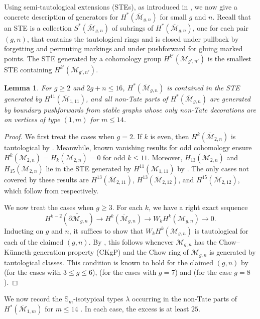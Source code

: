 \documentclass[12pt]{amsart}
\newtheorem{lem}[thm]{Lemma}
\theoremstyle{definition}
\numberwithin{equation}{section}
\renewcommand{\ss}{\mathbb{S}}
\newcommand{\M}{\mathcal{M}}
\renewcommand{\tilde}{\widetilde}
\newcommand{\Mb}{\overline{\M}}
\theoremstyle{definition} %
\theoremstyle{remark}
\begin{document}
Using semi-tautological extensions (STEs), as introduced in \cite[Definition~1.2]{CLP-STE}, we now give a concrete description of generators for $H^*(\Mb_{g,n})$ for small $g$ and $n$. Recall that an STE is a collection $S^*(\Mb_{g,n})$ of subrings of $H^*(\Mb_{g,n})$, one for each pair $(g,n)$, that contains the tautological rings and is closed under pullback by forgetting and permuting markings and under pushforward for gluing marked points. The STE generated by a cohomology group $H^{k'}(\Mb_{g',n'})$ is the smallest STE containing $H^{k'}(\Mb_{g',n'})$.
\begin{lem}\label{lem: onlygenus1}
    For $g\geq 2$ and $2g+n\leq 16$, $H^*(\Mb_{g,n})$ is contained in the STE generated by $H^{11}(\Mb_{1,11})$, and 
    all non-Tate parts of $H^*(\Mb_{g,n})$ are generated by boundary pushforwards from stable graphs whose only non-Tate decorations are on vertices of type $(1, m)$ for $m\leq 14$.
\end{lem}
\begin{proof}
We first treat the cases when $g = 2$. If $k$ is even, then $H^k(\Mb_{2,n})$ is tautological by \cite[Theorem 3.8]{Petersen}. 
Meanwhile, known vanishing results for odd cohomology \cite{ArbarelloCornalba,BergstromFaberPayne,CanningLarsonPayne} ensure $H^k(\Mb_{2,n}) = H_k(\Mb_{2,n}) = 0$ for odd $k \leq 11$. Moreover, $H_{13}(\Mb_{2,n})$ and $H_{15}(\Mb_{2,n})$ lie in the STE generated by $H^{11}(\Mb_{1,11})$ by \cite[Theorem 1.6 and Lemma 8.1]{CLP-STE}.
The only cases not covered by these results are $H^{13}(\Mb_{2,11})$, $H^{13}(\Mb_{2,12})$, and $H^{15}(\Mb_{2,12})$, which follow from \cite[Lemmas 7.1, 7.7, and 7.3]{CLP-STE} respectively.

We now treat the cases when $g \geq 3$. For each $k$, we have a right exact sequence
    \[
    H^{k-2}(\tilde{\partial \M_{g,n}})\rightarrow H^{k}(\Mb_{g,n})\rightarrow W_k H^{k}(\M_{g,n})\rightarrow 0. 
    \]
Inducting on $g$ and $n$, it suffices to show that $W_kH^k(\M_{g,n})$ is tautological for each of the claimed $(g, n)$.
By \cite[Lemma 4.3]{CLP-STE}, this follows whenever $\M_{g,n}$ has the Chow--K\"unneth generation property (CKgP) and
the Chow ring of $\M_{g,n}$ is generated by tautological classes. This condition is known to hold for the claimed $(g, n)$ by 
\cite[Theorem 1.4]{CL-CKgP} (for the cases with $3 \leq g \leq 6$), \cite[Theorem 1.10]{CLP-STE} (for the cases with $g = 7$) and
\cite[Theorem 1.2]{CanningLarson789} (for the case $g = 8$).
\end{proof}

We now record the $\ss_m$-isotypical types $\lambda$ occurring in the non-Tate parts of $H^*(\Mb_{1,m})$ for $m\leq 14$ \cite{BergstromData}. In each case, the excess is at least $25$.
\end{document}
